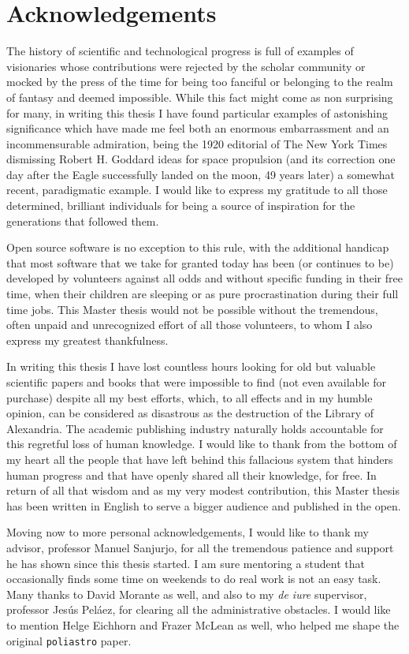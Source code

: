\chapter*{Acknowledgements}

The history of scientific and technological progress is full of examples of visionaries whose contributions were rejected by the scholar community or mocked by the press of the time for being too fanciful or belonging to the realm of fantasy and deemed impossible. While this fact might come as non surprising for many, in writing this thesis I have found particular examples of astonishing significance which have made me feel both an enormous embarrassment and an incommensurable admiration, being the 1920 editorial of The New York Times dismissing Robert H. Goddard ideas for space propulsion (and its correction one day after the Eagle successfully landed on the moon, 49 years later) a somewhat recent, paradigmatic example. I would like to express my gratitude to all those determined, brilliant individuals for being a source of inspiration for the generations that followed them.

Open source software is no exception to this rule, with the additional handicap that most software that we take for granted today has been (or continues to be) developed by volunteers against all odds and without specific funding in their free time, when their children are sleeping or as pure procrastination during their full time jobs. This Master thesis would not be possible without the tremendous, often unpaid and unrecognized effort of all those volunteers, to whom I also express my greatest thankfulness.

In writing this thesis I have lost countless hours looking for old but valuable scientific papers and books that were impossible to find (not even available for purchase) despite all my best efforts, which, to all effects and in my humble opinion, can be considered as disastrous as the destruction of the Library of Alexandria. The academic publishing industry naturally holds accountable for this regretful loss of human knowledge. I would like to thank from the bottom of my heart all the people that have left behind this fallacious system that hinders human progress and that have openly shared all their knowledge, for free. In return of all that wisdom and as my very modest contribution, this Master thesis has been written in English to serve a bigger audience and published in the open.

Moving now to more personal acknowledgements, I would like to thank my advisor, professor Manuel Sanjurjo, for all the tremendous patience and support he has shown since this thesis started. I am sure mentoring a student that occasionally finds some time on weekends to do real work is not an easy task. Many thanks to David Morante as well, and also to my \textit{de iure} supervisor, professor Jesús Peláez, for clearing all the administrative obstacles. I would like to mention Helge Eichhorn and Frazer McLean as well, who helped me shape the original \verb|poliastro| paper.

